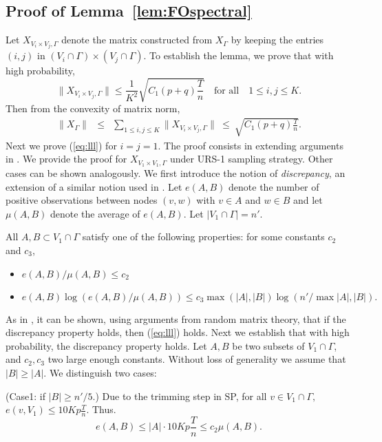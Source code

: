 \subsection{Proof of Lemma~\ref{lem:FOspectral}}
Let $X_{V_{i}\times V_{j} ,\Gamma}$ denote the matrix constructed from $X_{\Gamma}$ by keeping the entries $(i,j)$ in $(V_{i}\cap \Gamma) \times (V_{j} \cap \Gamma)$. To establish the lemma, we prove that 
with high probability,
\begin{equation}\label{eq:lll}
\| X_{V_{i}\times V_{j} ,\Gamma} \| \le
\frac{1}{K^2}\sqrt{C_1(p+q)\frac{T}{n}} \quad \mbox{for all} \quad 1\le
i,j \le K.
\end{equation}
Then from the convexity of matrix norm,
\begin{eqnarray}
\| X_{\Gamma}\|&\le& \sum_{1\le i,j \le K} \| X_{V_{i}\times V_{j} ,\Gamma}\|~\le~\sqrt{C_1(p+q)\frac{T}{n}}.
\end{eqnarray}
Next we prove (\ref{eq:lll}) for $i=j=1$. The proof consists in extending arguments in \cite{feige2005spectral}. We provide
the proof for $X_{V_{1}\times V_{1} ,\Gamma}$ under URS-1 sampling strategy. Other cases can be shown analogously. We first introduce the notion of {\it discrepancy}, an extension of a similar notion used in \cite{feige2005spectral}. Let $e(A,B)$  denote the number of positive observations between nodes $(v,w)$ with $v\in A$ and $w\in B$ and let $\mu(A,B)$ denote the average of $e(A,B)$. Let $|V_1 \cap \Gamma| = n'$. 
\begin{definition}
All $A, B \subset V_1\cap\Gamma$ satisfy one of the following properties: for some constants $c_2$ and $c_3$,
\begin{itemize}
\item$e(A,B)/\mu (A,B) \le
 c_2$ 
\item$e(A,B) \log(e(A,B)/\mu (A,B)) \le c_3 \max{(|A|,|B|)} \log
 (n'/\max{|A|,|B|}).$
\end{itemize}
\end{definition}

As in \cite{feige2005spectral}, it can be shown, using arguments from random matrix theory, that if the discrepancy property holds, then (\ref{eq:lll}) holds. Next we establish that with high probability, the discrepancy property holds. Let $A,B$ be two subsets of $V_1\cap\Gamma$, and $c_2,c_3$ two large enough constants. Without loss of generality we assume that $| B|\ge |A|$. We distinguish two cases:

\smallskip
\noindent(Case1: if $|B| \ge n'/5$.) Due to the trimming step in SP, for all $v\in V_1\cap\Gamma,$ $e(v,V_1)
\le 10Kp\frac{T}{n}.$ Thus. 
$$e(A,B) \le |A|\cdot 10Kp\frac{T}{n} \le c_2  \mu(A,B).$$ 

